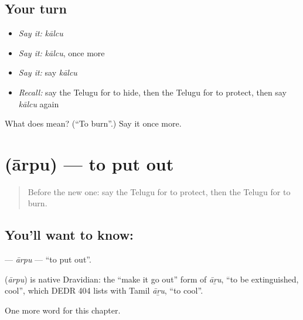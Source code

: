 \subsection*{Your turn}
\begin{itemize}
\raggedright
  \item \emph{Say it:} \emph{kālcu}
  \item \emph{Say it:} \emph{kālcu}, once more
  \item \emph{Say it:} say \emph{kālcu}
  \item \emph{Recall:} say the Telugu for to hide, then the Telugu for to protect, then say \emph{kālcu} again
\end{itemize}

\begin{tcolorbox}[breakable,colback=teal!4,colframe=teal!35!black,title={Before you move on}]
What does  mean? (\textquotedblleft{}To burn\textquotedblright{}.) Say it once more.
\end{tcolorbox}
\section[\texorpdfstring{\te{ఆర్పు} (ārpu)}{ఆర్పు (ārpu)}]{ (ārpu) — to put out}

\label{lesson:TE-C148-arpu}



\begin{quote}
Before the new one: say the Telugu for to protect, then the Telugu for to burn.
\end{quote}

\subsection*{You'll want to know: }
\textbf{} — \emph{ārpu} — \textquotedblleft{}to put out\textquotedblright{}.

\begin{cousinweb}
\textbf{} (\emph{ārpu}) is native Dravidian: the \textquotedblleft{}make it go out\textquotedblright{} form of \emph{āṟu}, \textquotedblleft{}to be extinguished, cool\textquotedblright{}, which DEDR 404 lists with Tamil \emph{āṟu}, \textquotedblleft{}to cool\textquotedblright{}.
\end{cousinweb}

\begin{grammarlens}[title={What you've built}]
One more word for this chapter.
\end{grammarlens}

